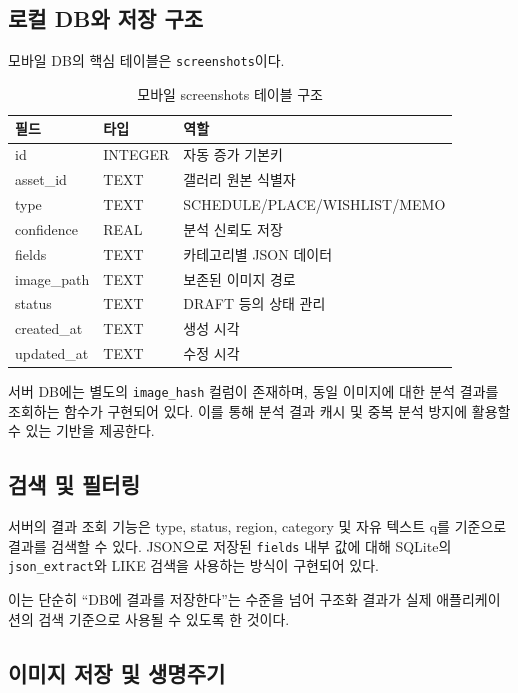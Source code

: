 \documentclass[11pt,a4paper]{article}
\begin{document}
\subsection{로컬 DB와 저장 구조}

모바일 DB의 핵심 테이블은 \texttt{screenshots}이다.

\begin{table}[H]
\centering
\small
\begin{tabularx}{\linewidth}{l l Y}
\toprule
\textbf{필드} & \textbf{타입} & \textbf{역할}\\
\midrule
id & INTEGER & 자동 증가 기본키\\
asset\_id & TEXT & 갤러리 원본 식별자\\
type & TEXT & SCHEDULE/PLACE/WISHLIST/MEMO\\
confidence & REAL & 분석 신뢰도 저장\\
fields & TEXT & 카테고리별 JSON 데이터\\
image\_path & TEXT & 보존된 이미지 경로\\
status & TEXT & DRAFT 등의 상태 관리\\
created\_at & TEXT & 생성 시각\\
updated\_at & TEXT & 수정 시각\\
\bottomrule
\end{tabularx}
\caption{모바일 screenshots 테이블 구조}
\end{table}

서버 DB에는 별도의 \texttt{image\_hash} 컬럼이 존재하며, 동일 이미지에 대한 분석 결과를 조회하는 함수가 구현되어 있다. 이를 통해 분석 결과 캐시 및 중복 분석 방지에 활용할 수 있는 기반을 제공한다.

\subsection{검색 및 필터링}

서버의 결과 조회 기능은 type, status, region, category 및 자유 텍스트 q를 기준으로 결과를 검색할 수 있다. JSON으로 저장된 \texttt{fields} 내부 값에 대해 SQLite의 \texttt{json\_extract}와 LIKE 검색을 사용하는 방식이 구현되어 있다.

이는 단순히 ``DB에 결과를 저장한다''는 수준을 넘어 구조화 결과가 실제 애플리케이션의 검색 기준으로 사용될 수 있도록 한 것이다.

\subsection{이미지 저장 및 생명주기}
\end{document}
